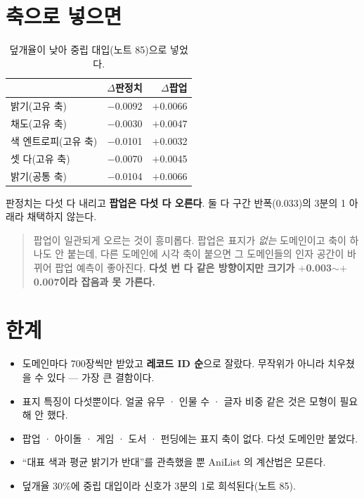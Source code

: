 \documentclass[10pt]{article}
\begin{document}

\section{축으로 넣으면}

\begin{table}[t]
\centering\tsize
\caption{덮개율이 낮아 중립 대입(노트 85)으로 넣었다.}
\begin{tabular}{lrr}
\toprule
& $\Delta$판정치 & $\Delta$팝업 \\
\midrule
밝기(고유 축) & $-$0.0092 & $+$0.0066 \\
채도(고유 축) & $-$0.0030 & $+$0.0047 \\
색 엔트로피(고유 축) & $-$0.0101 & $+$0.0032 \\
셋 다(고유 축) & $-$0.0070 & $+$0.0045 \\
밝기(공통 축) & $-$0.0104 & $+$0.0066 \\
\bottomrule
\end{tabular}
\end{table}

판정치는 다섯 다 내리고 \textbf{팝업은 다섯 다 오른다}. 둘 다 구간 반폭(0.033)의
3분의 1 아래라 채택하지 않는다.

\begin{quote}\fontsize{9.5}{11.5}\selectfont
팝업이 일관되게 오르는 것이 흥미롭다. 팝업은 표지가 \emph{없는} 도메인이고
축이 하나도 안 붙는데, 다른 도메인에 시각 축이 붙으면 그 도메인들의 인자 공간이
바뀌어 팝업 예측이 좋아진다. \textbf{다섯 번 다 같은 방향이지만 크기가
$+$0.003$\sim+$0.007이라 잡음과 못 가른다.}
\end{quote}

\section{한계}

\begin{itemize}[leftmargin=1.1em,itemsep=0.15em]
\item 도메인마다 700장씩만 받았고 \textbf{레코드 ID 순}으로 잘랐다. 무작위가
      아니라 치우쳤을 수 있다 --- 가장 큰 결함이다.
\item 표지 특징이 다섯뿐이다. 얼굴 유무 · 인물 수 · 글자 비중 같은 것은
      모형이 필요해 안 했다.
\item 팝업 · 아이돌 · 게임 · 도서 · 펀딩에는 표지 축이 없다. 다섯 도메인만
      붙었다.
\item ``대표 색과 평균 밝기가 반대''를 관측했을 뿐 AniList 의 계산법은 모른다.
\item 덮개율 30\%에 중립 대입이라 신호가 3분의 1로 희석된다(노트 85).
\end{itemize}
\end{document}

